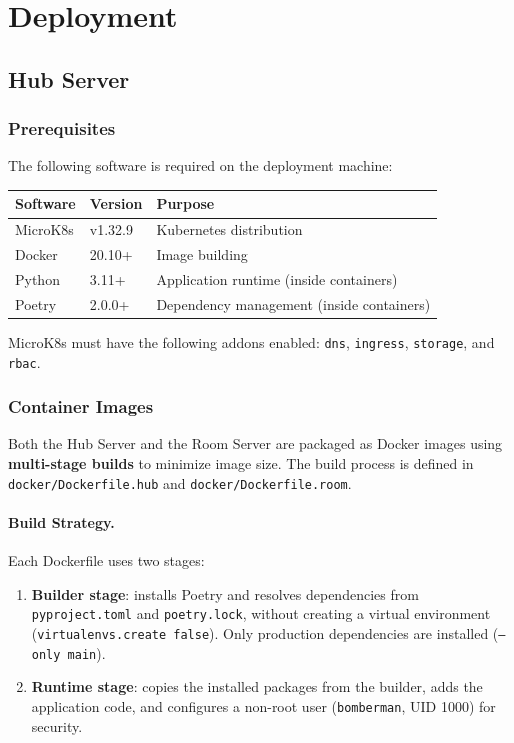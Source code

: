 \section{Deployment}\label{deployment}

\subsection{Hub Server}\label{deployment-hub}

\subsubsection{Prerequisites}

The following software is required on the deployment machine:

\begin{center}
  \begin{tabular}{l l l}
    \textbf{Software} & \textbf{Version} & \textbf{Purpose} \\
    \hline
    MicroK8s\cite{microk8s}        & v1.32.9           & Kubernetes distribution \\
    Docker \cite{docker}         & 20.10+            & Image building \\
    Python          & 3.11+             & Application runtime (inside containers) \\
    Poetry          & 2.0.0+            & Dependency management (inside containers) \\
  \end{tabular}
\end{center}

MicroK8s must have the following addons enabled: \texttt{dns}, \texttt{ingress}, \texttt{storage}, and \texttt{rbac}.

\subsubsection{Container Images}

Both the Hub Server and the Room Server are packaged as Docker images using \textbf{multi-stage builds} to minimize image size.
The build process is defined in \texttt{docker/Dockerfile.hub} and \texttt{docker/Dockerfile.room}.

\paragraph{Build Strategy.}
Each Dockerfile uses two stages:
\begin{enumerate}
  \item \textbf{Builder stage}: installs Poetry and resolves dependencies from \texttt{pyproject.toml} and \texttt{poetry.lock}, without creating a virtual environment (\texttt{virtualenvs.create false}). Only production dependencies are installed (\texttt{--only main}).
  \item \textbf{Runtime stage}: copies the installed packages from the builder, adds the application code, and configures a non-root user (\texttt{bomberman}, UID 1000) for security.
\end{enumerate}

